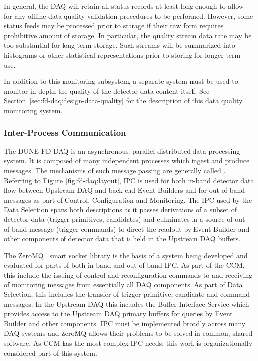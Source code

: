 In general, the DAQ will retain all status records at least long enough to allow for any offline data quality validation procedures to be performed. 
However, some status feeds may be processed prior to storage if their raw form requires prohibitive amount of storage. 
In particular, the quality stream data rate may be too substantial for long term storage. 
Such streams will be summarized into histograms or other statistical representations prior to storing for longer term use.

In addition to this   monitoring subsystem, a separate system must be used to monitor in depth the quality of the detector data content itself. 
See Section~\ref{sec:fd-daq:design-data-quality} for the description of this data quality monitoring system.

\subsubsection{Inter-Process Communication}
\label{sec:daq:design-ipc}

The DUNE FD DAQ is an asynchronous, parallel distributed data processing system. 
It is composed of many independent processes which ingest and produce messages. 
The mechanisms of such message passing are generally called . 
Referring to Figure~\ref{fig:fd-daq:layout}, IPC is used for both in-band detector data flow between Upstream DAQ and back-end Event Builders and for out-of-band messages as part of Control, Configuration and Monitoring.  The IPC used by the Data Selection spans both descriptions as it passes derivations of a subset of detector data (trigger primitives, candidates) and culminates in a source of out-of-band message (trigger commands) to direct the readout by Event Builder and other components of detector data that is held in the Upstream DAQ buffers.

The ZeroMQ~\cite{zeromq} smart socket library is the basis of a system being developed and evaluated for parts of both in-band and out-of-band IPC. 
As part of the CCM, this include the issuing of control and reconfiguration commands to and receiving of monitoring messages from essentially all DAQ components. 
As part of Data Selection, this includes the transfer of trigger primitive, candidate and command messages. 
In the Upstream DAQ this includes the Buffer Interface Service which provides access to the Upstream DAQ primary buffers for queries by Event Builder and other components. 
IPC must be implemented broadly across many DAQ systems and ZeroMQ allows their problems to be solved in common, shared software.  As CCM has the most complex IPC needs, this work is organizationally considered part of this system.

